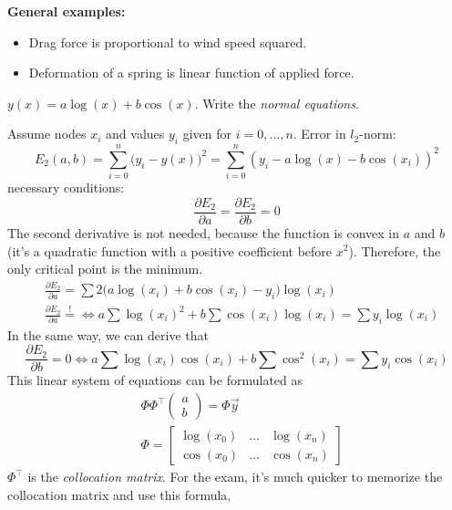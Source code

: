 \textbf{General examples:}
\begin{itemize}
    \item {
        Drag force is proportional to wind speed squared.
    }
    \item {
        Deformation of a spring is linear function of applied force.
    }
\end{itemize}

\begin{example}
    $y(x) = a \log(x) + b\cos(x)$.
    Write the \textit{normal equations}.

    Assume nodes $x_i$ and values $y_i$ given for
    $i = 0, \dots, n$. Error in $l_2$-norm:
    \[
        E_2(a, b) = \sum_{i=0}^n \bigl(y_i - y(x)\bigr)^2 = 
        \sum_{i=0}^n (y_i - a\log(x) - b\cos(x_i))^2
    \]
    necessary conditions:
    \[
        \frac{\partial E_2}{\partial a} = \frac{\partial E_2}{\partial b} = 0
    \]
    The second derivative is not needed, because the function is convex in $a$ and $b$
    (it's a quadratic function with a positive coefficient before $x^2$).
    Therefore, the only critical point is the minimum.
    \begin{align*}
        &\frac{\partial E_2}{\partial a} =
        \sum 2\bigl(a \log(x_i) + b\cos(x_i) - y_i\bigr) \log(x_i)\\
        &\frac{\partial E_2}{\partial a} \overset{!}{=} \iff
        a \sum \log(x_i)^2 + b\sum \cos(x_i) \log(x_i) = 
        \sum y_i \log(x_i)
    \end{align*}
    In the same way, we can derive that
    \[
        \frac{\partial E_2}{\partial b} = 0 \iff
        a \sum \log(x_i) \cos(x_i) + b\sum \cos^2(x_i) = 
        \sum y_i \cos(x_i)
    \]
    This linear system of equations can be formulated as 
    \begin{align*}
        &\Phi \Phi^\intercal \begin{pmatrix}
            a \\ b
        \end{pmatrix} = \Phi \vec{y}
        \\&
        \Phi = \begin{bmatrix}
            \log(x_0) & \dots & \log(x_n)\\
            \cos(x_0) & \dots & \cos(x_n)
        \end{bmatrix}
    \end{align*}
    $\Phi^\intercal$ is the \textit{collocation matrix}.
    For the exam, it's much quicker
    to memorize the collocation matrix and use this formula,

\end{example}
